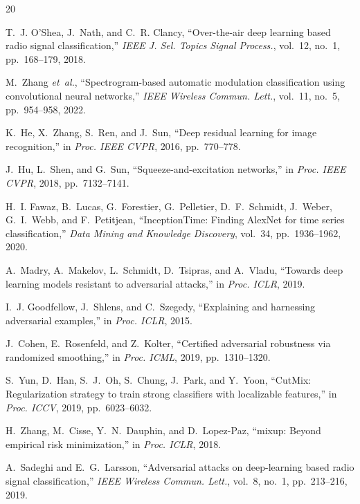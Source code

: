 \documentclass[conference]{IEEEtran}
\begin{document}
\begin{thebibliography}{20}

T.~J. O'Shea, J.~Nath, and C.~R. Clancy, ``Over-the-air deep learning based radio signal classification,'' \textit{IEEE J. Sel. Topics Signal Process.}, vol.~12, no.~1, pp.~168--179, 2018.

M.~Zhang \textit{et~al.}, ``Spectrogram-based automatic modulation classification using convolutional neural networks,'' \textit{IEEE Wireless Commun. Lett.}, vol.~11, no.~5, pp.~954--958, 2022.

K.~He, X.~Zhang, S.~Ren, and J.~Sun, ``Deep residual learning for image recognition,'' in \textit{Proc. IEEE CVPR}, 2016, pp.~770--778.

J.~Hu, L.~Shen, and G.~Sun, ``Squeeze-and-excitation networks,'' in \textit{Proc. IEEE CVPR}, 2018, pp.~7132--7141.

H.~I. Fawaz, B.~Lucas, G.~Forestier, G.~Pelletier, D.~F.~Schmidt, J.~Weber, G.~I.~Webb, and F.~Petitjean, ``InceptionTime: Finding AlexNet for time series classification,'' \textit{Data Mining and Knowledge Discovery}, vol.~34, pp.~1936--1962, 2020.

A.~Madry, A.~Makelov, L.~Schmidt, D.~Tsipras, and A.~Vladu, ``Towards deep learning models resistant to adversarial attacks,'' in \textit{Proc. ICLR}, 2019.

I.~J. Goodfellow, J.~Shlens, and C.~Szegedy, ``Explaining and harnessing adversarial examples,'' in \textit{Proc. ICLR}, 2015.

J.~Cohen, E.~Rosenfeld, and Z.~Kolter, ``Certified adversarial robustness via randomized smoothing,'' in \textit{Proc. ICML}, 2019, pp.~1310--1320.

S.~Yun, D.~Han, S.~J.~Oh, S.~Chung, J.~Park, and Y.~Yoon, ``CutMix: Regularization strategy to train strong classifiers with localizable features,'' in \textit{Proc. ICCV}, 2019, pp.~6023--6032.

H.~Zhang, M.~Cisse, Y.~N.~Dauphin, and D.~Lopez-Paz, ``mixup: Beyond empirical risk minimization,'' in \textit{Proc. ICLR}, 2018.

A.~Sadeghi and E.~G.~Larsson, ``Adversarial attacks on deep-learning based radio signal classification,'' \textit{IEEE Wireless Commun. Lett.}, vol.~8, no.~1, pp.~213--216, 2019.


\end{thebibliography}
\end{document}

